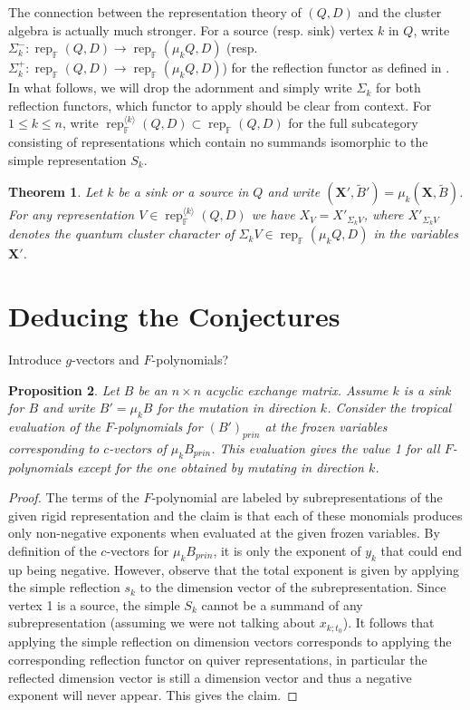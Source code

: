 \documentclass[12pt]{amsart}
\newtheorem{theorem}{Theorem}
\newtheorem{proposition}[theorem]{Proposition}
\newcommand{\bfX}{\mathbf{X}}
\newcommand{\FF}{\mathbb{F}}
\newcommand{\rep}{\operatorname{rep}}
\begin{document}
  The connection between the representation theory of $(Q,D)$ and the cluster algebra is actually much stronger.  For a source (resp. sink) vertex $k$ in $Q$, write $\Sigma_k^-:\rep_\FF(Q,D)\to\rep_\FF(\mu_kQ,D)$ (resp. $\Sigma_k^+:\rep_\FF(Q,D)\to\rep_\FF(\mu_kQ,D)$) for the reflection functor as defined in \cite[Sec. 2]{dlab-ringel}.  
  In what follows, we will drop the adornment and simply write $\Sigma_k$ for both reflection functors, which functor to apply should be clear from context.
  For $1\le k\le n$, write $\rep_\FF^{\langle k\rangle}(Q,D)\subset\rep_\FF(Q,D)$ for the full subcategory consisting of representations which contain no summands isomorphic to the simple representation $S_k$.
  \begin{theorem}\cite{rupel1}
    \label{th:reflection functor}
    Let $k$ be a sink or a source in $Q$ and write $(\bfX',\tilde B')=\mu_k(\bfX,\tilde B)$.  
    For any representation $V\in\rep_\FF^{\langle k\rangle}(Q,D)$ we have $X_V=X'_{\Sigma_kV}$, where $X'_{\Sigma_kV}$ denotes the quantum cluster character of $\Sigma_kV\in\rep_\FF(\mu_kQ,D)$ in the variables $\bfX'$.
  \end{theorem}

  \section{Deducing the Conjectures}
  Introduce $g$-vectors and $F$-polynomials?

  \begin{proposition}
    \label{prop:principal F-polynomials}
    Let $B$ be an $n\times n$ acyclic exchange matrix.
    Assume $k$ is a sink for $B$ and write $B'=\mu_k B$ for the mutation in direction $k$.
    Consider the tropical evaluation of the $F$-polynomials for $(B')_{prin}$ at the frozen variables corresponding to $c$-vectors of $\mu_k B_{prin}$.
    This evaluation gives the value 1 for all $F$-polynomials except for the one obtained by mutating in direction $k$.
  \end{proposition}
  \begin{proof}
    The terms of the $F$-polynomial are labeled by subrepresentations of the given rigid representation and the claim is that each of these monomials produces only non-negative exponents when evaluated at the given frozen variables.
    By definition of the $c$-vectors for $\mu_k B_{prin}$, it is only the exponent of $y_k$ that could end up being negative.
    However, observe that the total exponent is given by applying the simple reflection $s_k$ to the dimension vector of the subrepresentation.
    Since vertex 1 is a source, the simple $S_k$ cannot be a summand of any subrepresentation (assuming we were not talking about $x_{k;t_0}$).
    It follows that applying the simple reflection on dimension vectors corresponds to applying the corresponding reflection functor on quiver representations, in particular the reflected dimension vector is still a dimension vector and thus a negative exponent will never appear.
    This gives the claim.
  \end{proof}
\end{document}
